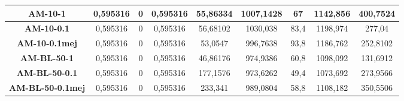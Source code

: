 \documentclass[12pt, spanish]{article}
\begin{document}
\begin{table}[H]
\begin{tabular}{|c|c|c|c|c|c|c|c|c|}
\textbf{AM-10-1}         & 0,595316                  & 0                           & 0,595316               & 55,86334   & 1007,1428                 & 67                          & 1142,856               & 400,7524   \\ \hline
\textbf{AM-10-0.1}       & 0,595316                  & 0                           & 0,595316               & 56,68102   & 1030,038                  & 83,4                        & 1198,974               & 277,04     \\ \hline
\textbf{AM-10-0.1mej}    & 0,595316                  & 0                           & 0,595316               & 53,0547    & 996,7638                  & 93,8                        & 1186,762               & 252,8102   \\ \hline
\textbf{AM-BL-50-1}      & 0,595316                  & 0                           & 0,595316               & 46,86176   & 974,9386                  & 60,8                        & 1098,092               & 131,6912   \\ \hline
\textbf{AM-BL-50-0.1}    & 0,595316                  & 0                           & 0,595316               & 177,1576   & 973,6262                  & 49,4                        & 1073,692               & 273,9566   \\ \hline
\textbf{AM-BL-50-0.1mej} & 0,595316                  & 0                           & 0,595316               & 233,341    & 989,0804                  & 58,8                        & 1108,182               & 350,5506   \\ \hline
\end{tabular}
\end{table}
\end{document}
